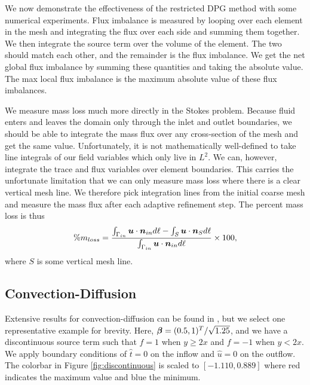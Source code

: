 \documentclass[Proposal.tex]{subfiles}
\begin{document}
We now demonstrate the effectiveness of the restricted DPG method with some numerical experiments.
Flux imbalance is measured by looping over each element in the mesh and
integrating the flux over each side and summing them together. We then
integrate the source term over the volume of the element. The two should match
each other, and the remainder is the flux imbalance. We get the net global
flux imbalance by summing these quantities and taking the absolute value. The
max local flux imbalance is the maximum absolute value of these flux
imbalances. 

We measure mass loss much more directly in the Stokes problem. Because
fluid enters and leaves the domain only through the inlet and outlet
boundaries, we should be able to integrate the mass flux over any
cross-section of the mesh and get the same value. Unfortunately, it is not
mathematically well-defined to take line integrals of our field variables which only
live in $L^2$. We can, however, integrate the trace and flux variables over element boundaries.
This carries the unfortunate limitation that we can only measure mass loss
where there is a clear vertical mesh line. We therefore pick integration lines
from the initial coarse mesh and measure the mass flux after each adaptive refinement
step. The percent mass loss is thus
\[
\%m_{loss}=\frac{\int_{\Gamma_{in}}\boldsymbol u\cdot\boldsymbol n_{in}d\ell-\int_S\boldsymbol u\cdot\boldsymbol n_Sd\ell}
{\int_{\Gamma_{in}}\boldsymbol u\cdot\boldsymbol n_{in}d\ell}\times100,
\]
where $S$ is some vertical mesh line.


\subsection{Convection-Diffusion}
Extensive results for convection-diffusion can be found in \cite{Ellis2013Report}, but we select one representative example for brevity.
Here, $\boldsymbol\beta=(0.5,1)^T/\sqrt{1.25}$, and we have a discontinuous source term
such that $f=1$ when $y\ge2x$ and $f=-1$ when $y<2x$. We apply boundary
conditions of $\hat t=0$ on the inflow and $\hat u=0$ on the outflow. 
The colorbar in Figure \ref{fig:discontinuous} is
scaled to  $[-1.110,0.889]$ where red indicates the maximum value and blue the minimum.
\end{document}
